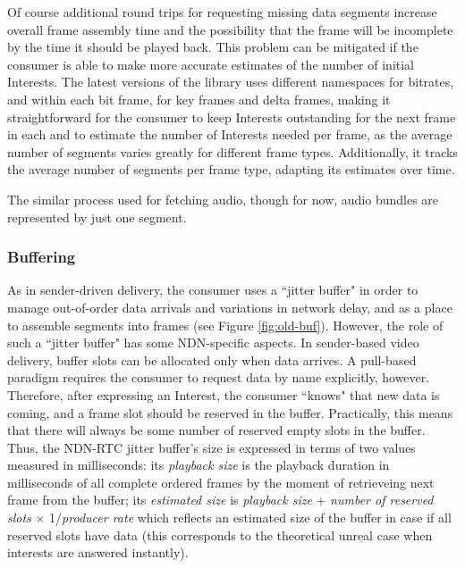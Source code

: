 \documentclass{icn/sig-alternate-2012} %
\newcommand{\ndnrtcName}{NDN-RTC} %
\begin{document}
Of course additional round trips for requesting missing data segments increase overall frame assembly time and the possibility that the frame will be incomplete by the time it should be played back. This problem can be mitigated if the consumer is able to make more accurate estimates of the number of initial Interests. The latest versions of the library uses different namespaces for bitrates, and within each bit frame, for key frames and delta frames, making it straightforward for the consumer to keep Interests outstanding for the next frame in each and to estimate the number of Interests needed per frame, as the average number of segments varies greatly for different frame types. 
Additionally, it tracks the average number of segments per frame type, adapting its estimates over time. 

The similar process used for fetching audio, though for now, audio bundles are represented by just one segment.

\subsubsection{Buffering}


As in sender-driven delivery, the consumer uses a ``jitter buffer" in order to manage out-of-order data arrivals and variations in network delay, and as a place to assemble segments into frames (see Figure \ref{fig:old-buf}). However, the role of such a ``jitter buffer"  has some NDN-specific aspects. In sender-based video delivery, buffer slots can be allocated only when data arrives. A pull-based paradigm requires the consumer to request data by name explicitly, however. Therefore, after expressing an Interest, the consumer ``knows" that new data is coming, and a frame slot should be reserved in the buffer. Practically, this means that there will always be some number of reserved empty slots in the buffer. Thus, the \ndnrtcName{} jitter buffer's size is expressed in terms of two values measured in milliseconds: its \textit{playback size} is the playback duration in milliseconds of all complete ordered frames by the moment of retrieveing next frame from the buffer; its \textit{estimated size} is \textit{playback size} + \textit{number of reserved slots} $\times$ 1/\textit{producer rate} which reflects an estimated size of the buffer in case if all reserved slots have data (this corresponds to the theoretical unreal case when interests are answered instantly).
\end{document}
